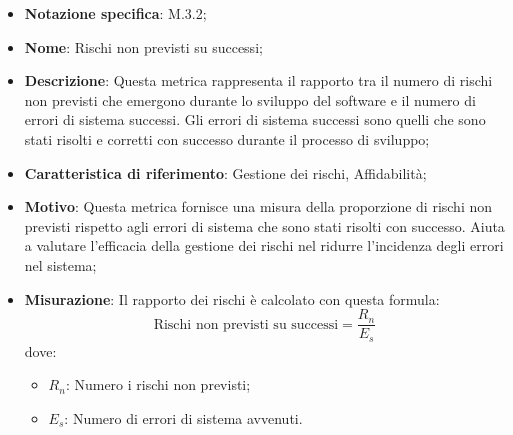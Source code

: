\begin{itemize}
    \item \textbf{Notazione specifica}: M.3.2;
    \item \textbf{Nome}: Rischi non previsti su successi;
    \item \textbf{Descrizione}: Questa metrica rappresenta il rapporto tra il numero di rischi non previsti che emergono durante lo sviluppo del software e il numero di errori di sistema successi. Gli errori di sistema successi sono quelli che sono stati risolti e corretti con successo durante il processo di sviluppo;
    \item \textbf{Caratteristica di riferimento}: Gestione dei rischi, Affidabilità;
    \item \textbf{Motivo}: Questa metrica fornisce una misura della proporzione di rischi non previsti rispetto agli errori di sistema che sono stati risolti con successo. Aiuta a valutare l'efficacia della gestione dei rischi nel ridurre l'incidenza degli errori nel sistema;
    \item \textbf{Misurazione}: Il rapporto dei rischi è calcolato con questa formula:
    \[
        \text{Rischi non previsti su successi} =\frac{R_{n}}{E_{s}}
    \]
    dove:
    \begin{itemize}
        \item $R_{n}$: Numero i rischi non previsti;
        \item $E_{s}$: Numero di errori di sistema avvenuti.
    \end{itemize}
\end{itemize}
